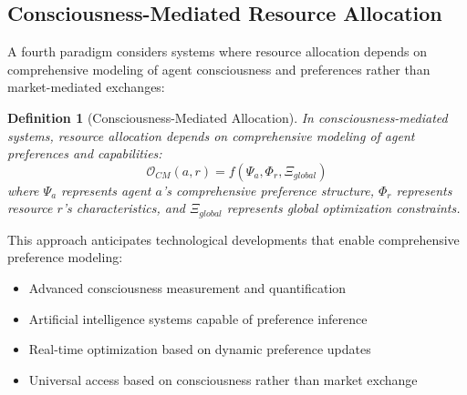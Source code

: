 \documentclass[12pt,a4paper]{article}
\newtheorem{definition}[theorem]{Definition}
\begin{document}
\subsection{Consciousness-Mediated Resource Allocation}

A fourth paradigm considers systems where resource allocation depends on comprehensive modeling of agent consciousness and preferences rather than market-mediated exchanges:

\begin{definition}[Consciousness-Mediated Allocation]
In consciousness-mediated systems, resource allocation depends on comprehensive modeling of agent preferences and capabilities:
\begin{equation}
\mathcal{O}_{CM}(a,r) = f(\Psi_a, \Phi_r, \Xi_{global})
\end{equation}
where $\Psi_a$ represents agent $a$'s comprehensive preference structure, $\Phi_r$ represents resource $r$'s characteristics, and $\Xi_{global}$ represents global optimization constraints.
\end{definition}

This approach anticipates technological developments that enable comprehensive preference modeling:
\begin{itemize}
\item Advanced consciousness measurement and quantification
\item Artificial intelligence systems capable of preference inference
\item Real-time optimization based on dynamic preference updates
\item Universal access based on consciousness rather than market exchange
\end{itemize}
\end{document}
